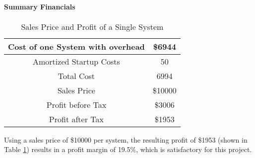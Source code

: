 \documentclass[PPFS.tex]{template/subfiles}
\begin{document}
        \paragraph{Summary Financials}
        
		\begin{table}[H]
			\begin{center}
				\caption{Sales Price and Profit of a Single System}
				\label{tab:SalesPrice}
				\begin{tabular}{|c|c|}
					\hline
					Cost of one System with overhead & \$6944\\
					\hline
					Amortized Startup Costs & 50\\
					\hline
					Total Cost & 6994\\
					\hline
					Sales Price & \$10000\\
					\hline
					Profit before Tax& \$3006\\
					\hline
					Profit after Tax& \$1953\\
					\hline
				\end{tabular}
			\end{center}
		\end{table}
        
        Using a sales price of \$10000 per system, the resulting profit of \$1953 (shown in Table \ref{tab:SalesPrice}) results in a profit margin of 19.5\%, which is satisfactory for this project.
        
        
\end{document}
